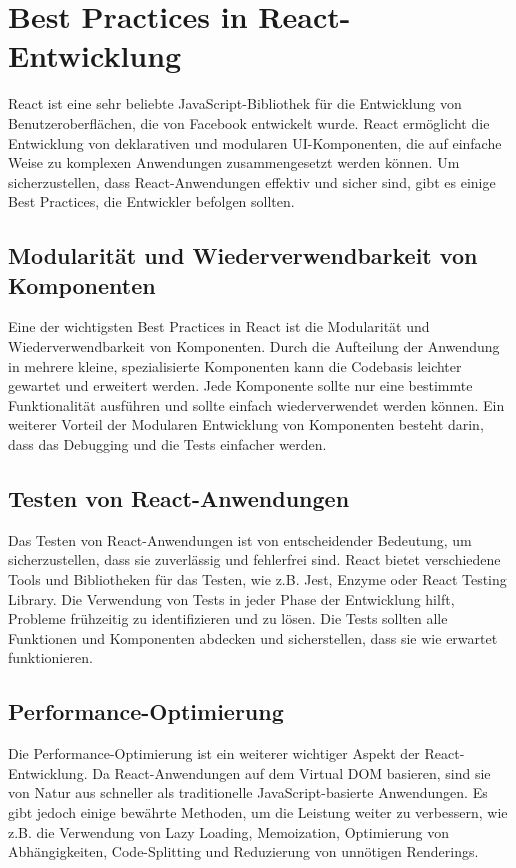 \section{Best Practices in React-Entwicklung}
React ist eine sehr beliebte JavaScript-Bibliothek für die Entwicklung von Benutzeroberflächen, die von Facebook entwickelt wurde. React ermöglicht die Entwicklung von deklarativen und modularen UI-Komponenten, die auf einfache Weise zu komplexen Anwendungen zusammengesetzt werden können. Um sicherzustellen, dass React-Anwendungen effektiv und sicher sind, gibt es einige Best Practices, die Entwickler befolgen sollten.

\subsection{Modularität und Wiederverwendbarkeit von Komponenten}
Eine der wichtigsten Best Practices in React ist die Modularität und Wiederverwendbarkeit von Komponenten. Durch die Aufteilung der Anwendung in mehrere kleine, spezialisierte Komponenten kann die Codebasis leichter gewartet und erweitert werden. Jede Komponente sollte nur eine bestimmte Funktionalität ausführen und sollte einfach wiederverwendet werden können. Ein weiterer Vorteil der Modularen Entwicklung von Komponenten besteht darin, dass das Debugging und die Tests einfacher werden.

\subsection{Testen von React-Anwendungen}
Das Testen von React-Anwendungen ist von entscheidender Bedeutung, um sicherzustellen, dass sie zuverlässig und fehlerfrei sind. React bietet verschiedene Tools und Bibliotheken für das Testen, wie z.B. Jest, Enzyme oder React Testing Library. Die Verwendung von Tests in jeder Phase der Entwicklung hilft, Probleme frühzeitig zu identifizieren und zu lösen. Die Tests sollten alle Funktionen und Komponenten abdecken und sicherstellen, dass sie wie erwartet funktionieren.

\subsection{Performance-Optimierung}
Die Performance-Optimierung ist ein weiterer wichtiger Aspekt der React-Entwicklung. Da React-Anwendungen auf dem Virtual DOM basieren, sind sie von Natur aus schneller als traditionelle JavaScript-basierte Anwendungen. Es gibt jedoch einige bewährte Methoden, um die Leistung weiter zu verbessern, wie z.B. die Verwendung von Lazy Loading, Memoization, Optimierung von Abhängigkeiten, Code-Splitting und Reduzierung von unnötigen Renderings.


